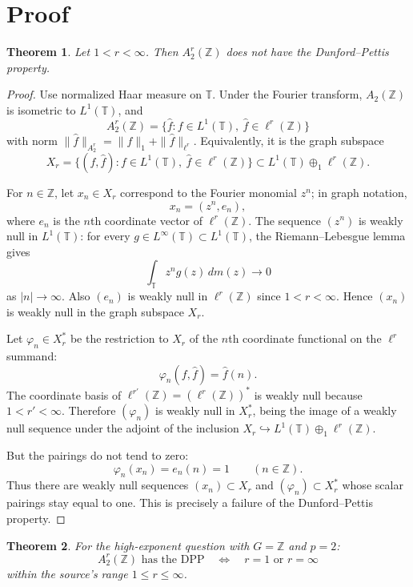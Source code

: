 \documentclass[11pt]{amsart}
\newtheorem{theorem}{Theorem}
\theoremstyle{remark}
\begin{document}
\section*{Proof}

\begin{theorem}
Let $1<r<\infty$.  Then $A_2^r(\mathbb Z)$ does not have the
Dunford--Pettis property.
\end{theorem}

\begin{proof}
Use normalized Haar measure on $\mathbb T$.  Under the Fourier transform,
$A_2(\mathbb Z)$ is isometric to $L^1(\mathbb T)$, and
\[
 A_2^r(\mathbb Z)
   =\{ \widehat f : f\in L^1(\mathbb T),\ \widehat f\in \ell^r(\mathbb Z)\}
\]
with norm $\|\widehat f\|_{A_2^r}=\|f\|_1+\|\widehat f\|_{\ell^r}$.
Equivalently, it is the graph subspace
\[
 X_r=\{(f,\widehat f): f\in L^1(\mathbb T),\ \widehat f\in\ell^r(\mathbb Z)\}
      \subset L^1(\mathbb T)\oplus_1 \ell^r(\mathbb Z).
\]

For $n\in\mathbb Z$, let $x_n\in X_r$ correspond to the Fourier monomial
$z^n$; in graph notation,
\[
        x_n=(z^n,e_n),
\]
where $e_n$ is the $n$th coordinate vector of $\ell^r(\mathbb Z)$.
The sequence $(z^n)$ is weakly null in $L^1(\mathbb T)$: for every
$g\in L^\infty(\mathbb T)\subset L^1(\mathbb T)$, the Riemann--Lebesgue lemma
gives
\[
        \int_{\mathbb T} z^n g(z)\,dm(z)\longrightarrow 0
\]
as $|n|\to\infty$.  Also $(e_n)$ is weakly null in $\ell^r(\mathbb Z)$ since
$1<r<\infty$.  Hence $(x_n)$ is weakly null in the graph subspace $X_r$.

Let $\varphi_n\in X_r^*$ be the restriction to $X_r$ of the $n$th coordinate
functional on the $\ell^r$ summand:
\[
        \varphi_n(f,\widehat f)=\widehat f(n).
\]
The coordinate basis of $\ell^{r'}(\mathbb Z)=(\ell^r(\mathbb Z))^*$ is weakly
null because $1<r'<\infty$.  Therefore $(\varphi_n)$ is weakly null in
$X_r^*$, being the image of a weakly null sequence under the adjoint of the
inclusion $X_r\hookrightarrow L^1(\mathbb T)\oplus_1\ell^r(\mathbb Z)$.

But the pairings do not tend to zero:
\[
        \varphi_n(x_n)=e_n(n)=1\qquad(n\in\mathbb Z).
\]
Thus there are weakly null sequences $(x_n)\subset X_r$ and
$(\varphi_n)\subset X_r^*$ whose scalar pairings stay equal to one.  This is
precisely a failure of the Dunford--Pettis property.
\end{proof}

\begin{theorem}
For the high-exponent question with $G=\mathbb Z$ and $p=2$:
\[
 A_2^r(\mathbb Z) \text{ has the DPP}
 \quad\Longleftrightarrow\quad
 r=1 \text{ or } r=\infty
\]
within the source's range $1\le r\le\infty$.
\end{theorem}
\end{document}
